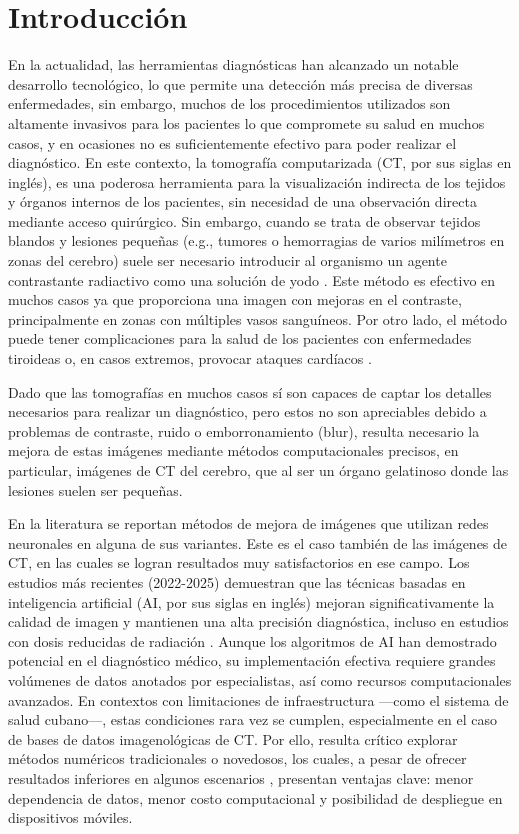 \chapter*{Introducción}\label{chapter:introduction}
En la actualidad, las herramientas diagnósticas han alcanzado un notable desarrollo tecnológico, lo que permite una detección más precisa de diversas enfermedades, sin embargo, muchos de los procedimientos utilizados son altamente invasivos para los pacientes lo que compromete su salud en muchos casos, y en ocasiones no es suficientemente efectivo para poder realizar el diagnóstico. En este contexto, la tomografía computarizada (CT, por sus siglas en inglés), es una poderosa herramienta para la visualización indirecta de los tejidos y órganos internos de los pacientes, sin necesidad de una observación directa mediante acceso quirúrgico. Sin embargo, cuando se trata de observar tejidos blandos y lesiones pequeñas (e.g., tumores o hemorragias de varios milímetros en zonas del cerebro) suele ser necesario introducir al organismo un agente contrastante radiactivo como una solución de yodo \cite{InsideRadiologyICCM}. Este método es efectivo en muchos casos ya que proporciona una imagen con mejoras en el contraste, principalmente en zonas con múltiples vasos sanguíneos. Por otro lado, el método puede tener complicaciones para la salud de los pacientes con enfermedades tiroideas o, en casos extremos, provocar ataques cardíacos \cite{IodineTyroids,IodineHeathAttack}.

Dado que las tomografías en muchos casos sí son capaces de captar los detalles necesarios para realizar un diagnóstico, pero estos no son apreciables debido a problemas de contraste, ruido o emborronamiento (blur), resulta necesario la mejora de estas imágenes mediante métodos computacionales precisos, en particular, imágenes de CT del cerebro, que al ser un órgano gelatinoso donde las lesiones suelen ser pequeñas. 

En la literatura se reportan métodos de mejora de imágenes que utilizan redes neuronales en alguna de sus variantes. Este es el caso también de las imágenes de CT, en las cuales se logran resultados muy satisfactorios en ese campo. Los estudios más recientes (2022-2025) demuestran que las técnicas basadas en inteligencia artificial (AI, por sus siglas en inglés) mejoran significativamente la calidad de imagen y mantienen una alta precisión diagnóstica, incluso en estudios con dosis reducidas de radiación \cite{AISurveyOnImageQuality}. Aunque los algoritmos de AI han demostrado potencial en el diagnóstico médico, su implementación efectiva requiere grandes volúmenes de datos anotados por especialistas, así como recursos computacionales avanzados. En contextos con limitaciones de infraestructura —como el sistema de salud cubano—, estas condiciones rara vez se cumplen, especialmente en el caso de bases de datos imagenológicas de CT. Por ello, resulta crítico explorar métodos numéricos tradicionales o novedosos, los cuales, a pesar de ofrecer resultados inferiores en algunos escenarios , presentan ventajas clave: menor dependencia de datos, menor costo computacional y posibilidad de despliegue en dispositivos móviles.

